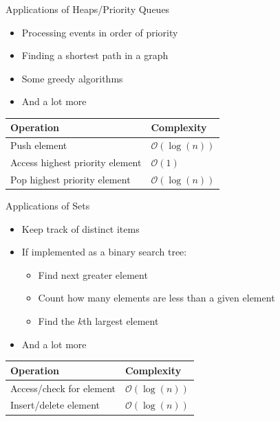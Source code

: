 \documentclass{beamer}
\begin{document}
\begin{frame}[plain]{Applications of Heaps/Priority Queues}
    \begin{itemize}
        \item Processing events in order of priority
        \item Finding a shortest path in a graph
        \item Some greedy algorithms
        \item And a lot more
    \end{itemize}
    \vspace*{1cm}
    \begin{center}
    \begin{tabular}{l|l}
    Operation & Complexity \\ \hline
    Push element & $\mathcal{O}(\log(n))$ \\
    Access highest priority element & $\mathcal{O}(1)$ \\
    Pop highest priority element & $\mathcal{O}(\log(n))$ \\
    \end{tabular}
    \end{center}
\end{frame}

\begin{frame}[plain]{Applications of Sets}
    \begin{itemize}
        \item Keep track of distinct items
        \item If implemented as a binary search tree:
        \begin{itemize}
            \item Find next greater element
            \item Count how many elements are less than a given element
            \item Find the $k$th largest element
        \end{itemize}
        \item And a lot more
    \end{itemize}
    \vspace*{1cm}
    \begin{center}
    \begin{tabular}{l|l}
    Operation & Complexity \\ \hline
    Access/check for element & $\mathcal{O}(\log(n))$ \\
    Insert/delete element & $\mathcal{O}(\log(n))$ \\
    \end{tabular}
    \end{center}
\end{frame}
\end{document}
